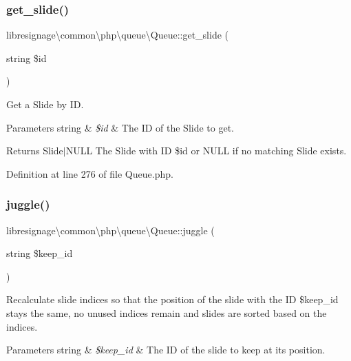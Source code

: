 \subsubsection{\texorpdfstring{get\+\_\+slide()}{get\_slide()}}
{\footnotesize\ttfamily libresignage\textbackslash{}common\textbackslash{}php\textbackslash{}queue\textbackslash{}\+Queue\+::get\+\_\+slide (\begin{DoxyParamCaption}\item[{string}]{\$id }\end{DoxyParamCaption})}

Get a Slide by ID.


\begin{DoxyParams}[1]{Parameters}
string & {\em \$id} & The ID of the Slide to get. \\
\hline
\end{DoxyParams}
\begin{DoxyReturn}{Returns}
Slide$\vert$\+N\+U\+LL The Slide with ID \$id or N\+U\+LL if no matching Slide exists. 
\end{DoxyReturn}


Definition at line 276 of file Queue.\+php.

\mbox{\label{classlibresignage_1_1common_1_1php_1_1queue_1_1Queue_a5b9e3298214db1fc911a599dd092d373}} 
\subsubsection{\texorpdfstring{juggle()}{juggle()}}
{\footnotesize\ttfamily libresignage\textbackslash{}common\textbackslash{}php\textbackslash{}queue\textbackslash{}\+Queue\+::juggle (\begin{DoxyParamCaption}\item[{string}]{\$keep\+\_\+id }\end{DoxyParamCaption})}

Recalculate slide indices so that the position of the slide with the ID \$keep\+\_\+id stays the same, no unused indices remain and slides are sorted based on the indices.


\begin{DoxyParams}[1]{Parameters}
string & {\em \$keep\+\_\+id} & The ID of the slide to keep at it\textquotesingle{}s position.\\
\hline
\end{DoxyParams}


